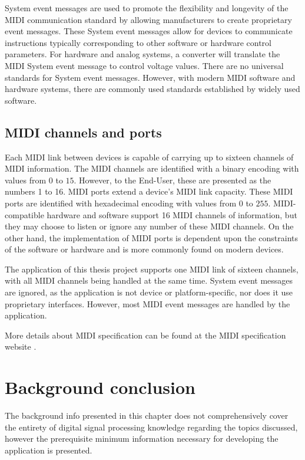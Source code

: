 \documentclass[a4paper,12pt]{report}
\begin{document}
System event messages are used to promote the flexibility and longevity of the MIDI communication standard by allowing manufacturers to create proprietary event messages. These System event messages allow for devices to communicate instructions typically corresponding to other software or hardware control parameters. For hardware and analog systems, a converter will translate the MIDI System event message to control voltage values. There are no universal standards for System event messages. However, with modern MIDI software and hardware systems, there are commonly used standards established by widely used software.

\subsection{MIDI channels and ports}
\label{subsec:midichannelports}
Each MIDI link between devices is capable of carrying up to sixteen channels of MIDI information. The MIDI channels are identified with a binary encoding with values from $0$ to $15$. However, to the End-User, these are presented as the numbers 1 to 16. MIDI ports extend a device's MIDI link capacity. These MIDI ports are identified with hexadecimal encoding with values from $0$ to $255$. MIDI-compatible hardware and software support 16 MIDI channels of information, but they may choose to listen or ignore any number of these MIDI channels. On the other hand, the implementation of MIDI ports is dependent upon the constraints of the software or hardware and is more commonly found on modern devices.

The application of this thesis project supports one MIDI link of sixteen channels, with all MIDI channels being handled at the same time. System event messages are ignored, as the application is not device or platform-specific, nor does it use proprietary interfaces. However, most MIDI event messages are handled by the application.

More details about MIDI specification can be found at the MIDI specification website \cite{midispec}.

\section{Background conclusion}
The background info presented in this chapter does not comprehensively cover the entirety of digital signal processing knowledge regarding the topics discussed, however the prerequisite minimum information necessary for developing the application is presented.
\end{document}
